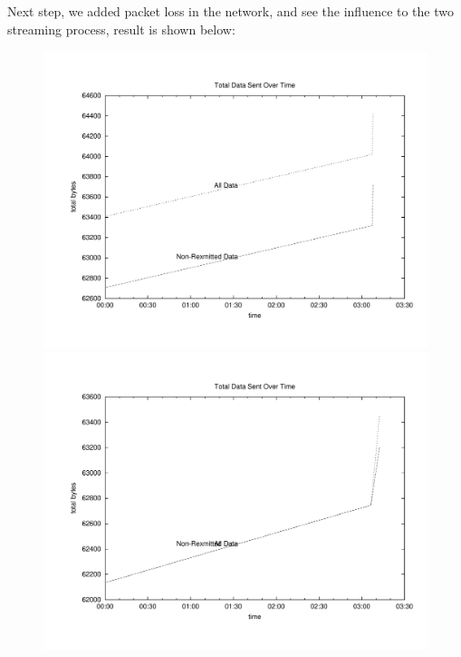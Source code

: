 Next step, we added packet loss in the network, and see the influence to the two
streaming process, result is shown below:
\begin{figure}[H]
\begin{minipage}[b]{0.45\linewidth}
\centering
\includegraphics[width=\textwidth]{charts/airplay_traffic_data}
\end{minipage}
\begin{minipage}[b]{0.45\linewidth}
\centering
\includegraphics[width=\textwidth]{charts/airplay_traffic_5loss_data}
\end{minipage}
\begin{minipage}[b]{0.45\linewidth}

\end{minipage}
\end{figure}

